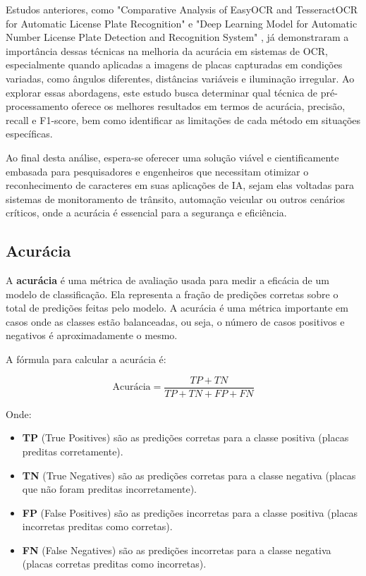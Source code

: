 \documentclass[conference]{IEEEtran}
\begin{document}
Estudos anteriores, como "Comparative Analysis of EasyOCR and TesseractOCR for Automatic License Plate Recognition" \cite{b1} e "Deep Learning Model for Automatic Number License Plate Detection and Recognition System" \cite{b2} , já demonstraram a importância dessas técnicas na melhoria da acurácia em sistemas de OCR, especialmente quando aplicadas a imagens de placas capturadas em condições variadas, como ângulos diferentes, distâncias variáveis e iluminação irregular. Ao explorar essas abordagens, este estudo busca determinar qual técnica de pré-processamento oferece os melhores resultados em termos de acurácia, precisão, recall e F1-score, bem como identificar as limitações de cada método em situações específicas.

Ao final desta análise, espera-se oferecer uma solução viável e cientificamente embasada para pesquisadores e engenheiros que necessitam otimizar o reconhecimento de caracteres em suas aplicações de IA, sejam elas voltadas para sistemas de monitoramento de trânsito, automação veicular ou outros cenários críticos, onde a acurácia é essencial para a segurança e eficiência.

\subsection{Acurácia}

A \textbf{acurácia} é uma métrica de avaliação usada para medir a eficácia de um modelo de classificação. Ela representa a fração de predições corretas sobre o total de predições feitas pelo modelo. A acurácia é uma métrica importante em casos onde as classes estão balanceadas, ou seja, o número de casos positivos e negativos é aproximadamente o mesmo.

A fórmula para calcular a acurácia é:

\[
\text{Acurácia} = \frac{TP + TN}{TP + TN + FP + FN}
\]

Onde:

\begin{itemize}
	\item \textbf{TP} (True Positives) são as predições corretas para a classe positiva (placas preditas corretamente).
	\item \textbf{TN} (True Negatives) são as predições corretas para a classe negativa (placas que não foram preditas incorretamente).
	\item \textbf{FP} (False Positives) são as predições incorretas para a classe positiva (placas incorretas preditas como corretas).
	\item \textbf{FN} (False Negatives) são as predições incorretas para a classe negativa (placas corretas preditas como incorretas).
\end{itemize}
\end{document}
